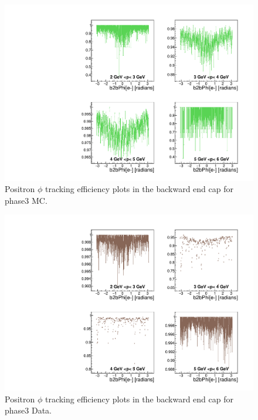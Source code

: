 \documentclass[a4paper,11pt,twosided,final,german,openbib,pdftex,listof=totoc,bibliography=totoc]{scrbook}
\begin{document}
\begin{appendix}






\begin{figure}[!htbp]
	\centering
	\includegraphics[width=\textwidth]{Plots/master3/xPMPhiepEC_MCP3}
	\caption[Momentum $\phi$ Positron Backward End Cap Efficiency Phase3 MC]{Positron $\phi$ tracking efficiency plots in the backward end cap for phase3 MC.}
	\label{plt:PMPhiepEC3_MC}
\end{figure}


\begin{figure}[!htbp]
	\centering
	\includegraphics[width=\textwidth]{Plots/master3/xPMPhiepEC_DataP3}
	\caption[Momentum $\phi$ Positron Backward End Cap Efficiency Phase3 Data]{Positron $\phi$ tracking efficiency plots in the backward end cap for phase3 Data.}
	\label{plt:PMPhiepEC3_Data}
\end{figure}




\end{appendix}
\end{document}
